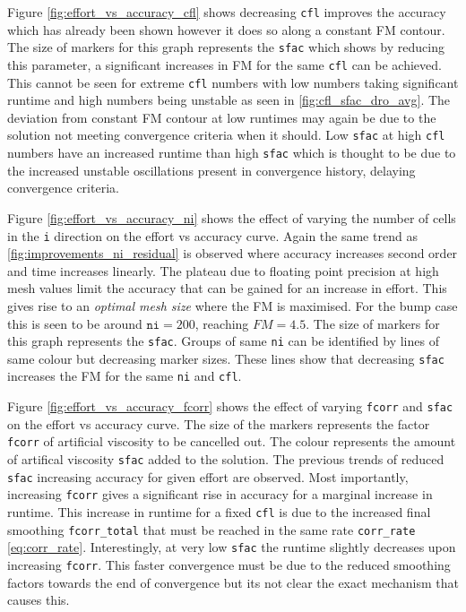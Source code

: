 \documentclass{article}
\begin{document}
Figure \ref{fig:effort_vs_accuracy_cfl} shows decreasing \texttt{cfl} improves the accuracy which has already been shown however it does so along a constant FM contour.
The size of markers for this graph represents the \texttt{sfac} which shows by reducing this parameter, a significant increases in FM for the same \texttt{cfl} can be achieved.
This cannot be seen for extreme \texttt{cfl} numbers with low numbers taking significant runtime and high numbers being unstable as seen in \ref{fig:cfl_sfac_dro_avg}.
The deviation from constant FM contour at low runtimes may again be due to the solution not meeting convergence criteria when it should.
Low \texttt{sfac} at high \texttt{cfl} numbers have an increased runtime than high \texttt{sfac} which is thought to be due to the increased unstable oscillations
present in convergence history, delaying convergence criteria.

Figure \ref{fig:effort_vs_accuracy_ni} shows the effect of varying the number of cells in the \texttt{i} direction on the effort vs accuracy curve.
Again the same trend as \ref{fig:improvements_ni_residual} is observed where accuracy increases second order and time increases linearly.
The plateau due to floating point precision at high mesh values limit the accuracy that can be gained for an increase in effort.
This gives rise to an \textit{optimal mesh size} where the FM is maximised.
For the bump case this is seen to be around $\texttt{ni}=200$, reaching $FM =4.5$.
The size of markers for this graph represents the \texttt{sfac}.
Groups of same \texttt{ni} can be identified by lines of same colour but decreasing marker sizes.
These lines show that decreasing \texttt{sfac} increases the FM for the same \texttt{ni} and \texttt{cfl}.

Figure \ref{fig:effort_vs_accuracy_fcorr} shows the effect of varying \texttt{fcorr} and \texttt{sfac} on the effort vs accuracy curve.
The size of the markers represents the factor \texttt{fcorr} of artificial viscosity to be cancelled out.
The colour represents the amount of artifical viscosity \texttt{sfac} added to the solution.
The previous trends of reduced \texttt{sfac} increasing accuracy for given effort are observed.
Most importantly, increasing \texttt{fcorr} gives a significant rise in accuracy for a marginal increase in runtime.
This increase in runtime for a fixed \texttt{cfl} is due to the increased final smoothing \texttt{fcorr\_total} that must be reached in the same rate \texttt{corr\_rate} \ref{eq:corr_rate}.
Interestingly, at very low \texttt{sfac} the runtime slightly decreases upon increasing \texttt{fcorr}.
This faster convergence must be due to the reduced smoothing factors towards the end of convergence but its not clear the exact mechanism that causes this.
\end{document}
